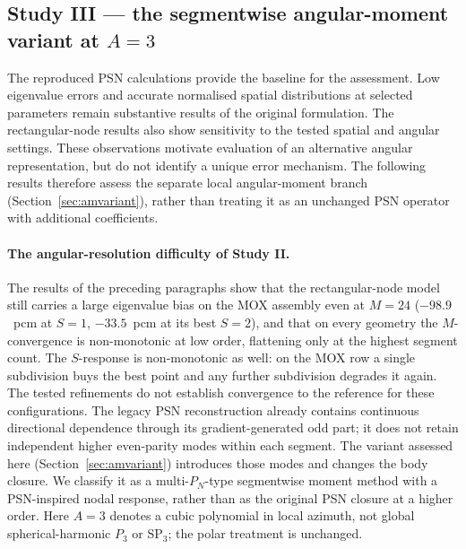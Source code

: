 \clearpage
\subsection{Study III --- the segmentwise angular-moment variant at $A{=}3$}


The reproduced PSN calculations provide the baseline for the
assessment. Low eigenvalue errors and accurate normalised spatial
distributions at selected parameters remain substantive results of the
original formulation. The rectangular-node results also show sensitivity
to the tested spatial and angular settings. These observations motivate
evaluation of an alternative angular representation, but do not identify
a unique error mechanism. The following results therefore assess the
separate local angular-moment branch (Section~\ref{sec:amvariant}),
rather than treating it as an unchanged PSN operator with additional
coefficients.

\paragraph{The angular-resolution difficulty of Study II.}
The results of the preceding paragraphs show that the
rectangular-node model still carries a large eigenvalue bias on the MOX
assembly even at $M{=}24$ ($-98.9$~pcm at $S{=}1$, $-33.5$~pcm at its
best $S{=}2$), and that on every geometry the $M$-convergence is
non-monotonic at low order, flattening only at the highest segment
count. The $S$-response is non-monotonic as well: on the MOX row a
single subdivision buys the best point and any further subdivision
degrades it again. The tested refinements do not establish convergence
to the reference for these configurations. The legacy PSN
reconstruction already contains continuous directional dependence
through its gradient-generated odd part; it does not retain independent
higher even-parity modes within each segment. The variant assessed
here (Section~\ref{sec:amvariant}) introduces those modes and changes
the body closure. We classify it as a multi-$P_N$-type segmentwise
moment method with a PSN-inspired nodal response, rather than as the
original PSN closure at a higher order. Here $A{=}3$ denotes a cubic
polynomial in local azimuth, not global spherical-harmonic $P_3$ or
SP$_3$; the polar treatment is unchanged.

